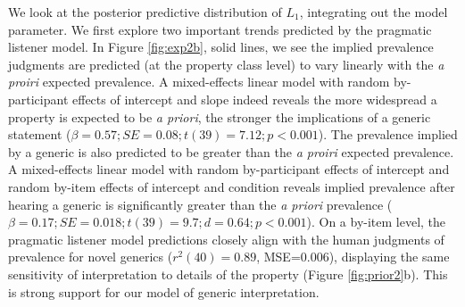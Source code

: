 \documentclass[12pt,letterpaper]{article}
\newcommand{\ndg}[1]{\textcolor{Green}{[ndg: #1]}}
\newcommand{\mht}[1]{\textcolor{Blue}{[mht: #1]}}
\begin{document}
We look at the posterior predictive distribution of $L_1$, integrating out the model parameter.
We first explore two important trends predicted by the pragmatic listener model.
In Figure \ref{fig:exp2b}, solid lines, we see the implied prevalence judgments are predicted (at the property class level) to vary linearly with the \emph{a proiri} expected prevalence. 
A mixed-effects linear model with random by-participant effects of intercept and slope indeed reveals the more widespread a property is expected to be \emph{a priori}, the stronger the implications of a generic statement ($\beta = 0.57; SE = 0.08; t(39) = 7.12; p < 0.001$).
The prevalence implied by a generic is also predicted to be greater than the \emph{a proiri} expected prevalence.
A mixed-effects linear model with random by-participant effects of intercept and random by-item effects of intercept and condition reveals implied prevalence after hearing a generic is significantly greater than the \emph{a priori} prevalence ($\beta = 0.17; SE = 0.018; t(39) = 9.7; d = 0.64; p < 0.001$).
On a by-item level, the pragmatic listener model predictions closely align with the human judgments of prevalence for novel generics ($r^2(40)=0.89$, MSE=0.006), displaying the same sensitivity of interpretation to details of the property (Figure \ref{fig:prior2}b). 
This is strong support for our model of generic interpretation.




\end{document}
